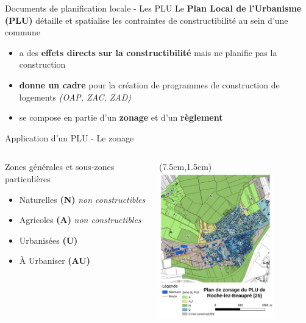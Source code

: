 \documentclass[xcolor=table]{beamer}
\begin{document}
\begin{frame}{Documents de planification locale - Les PLU}
	Le \textbf{Plan Local de l’Urbanisme (PLU)} détaille et spatialise les contraintes de constructibilité au sein d’une commune
	\begin{itemize}
		\item a des \textbf{effets directs sur la constructibilité} mais ne planifie pas la construction 
		\item \textbf{donne un cadre} pour la création de programmes de construction de logements \textit{(OAP, ZAC, ZAD)}
		\item se compose en partie d'un \textbf{zonage} et d'un \textbf{règlement}
	\end{itemize}
\end{frame}	

\begin{frame}{Application d'un PLU - Le zonage}
	\begin{columns}[T]
		\begin{column}[T]{7cm}
			Zones générales et sous-zones particulières
			\begin{itemize}
				\item \alert{Naturelles} \textbf{(N)} \emph{non constructibles}
				\item \alert{Agricoles} \textbf{(A)} \emph{non constructibles}
				\item \alert{Urbanisées} \textbf{(U)}
				\item \alert{À Urbaniser} \textbf{(AU)}
			\end{itemize}
		\end{column}
		\begin{column}[T]{4cm}
			\begin{textblock*}{6cm}(7.5cm,1.5cm)
				\includegraphics[width=5cm]{cartes/plu-roche.png}
			\end{textblock*}	
		\end{column}
	\end{columns}
	
\end{frame}
\end{document}
